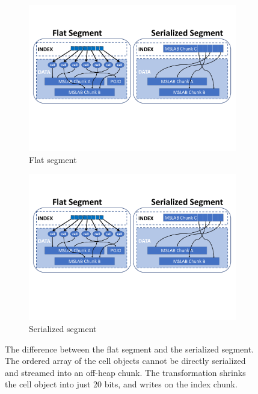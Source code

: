 \begin{figure}[tb]

  \centering
  
  \begin{subfigure}[t]{0.65\columnwidth}
      \includegraphics[width=\figw]{flat-serializing.pdf}
      \caption[]{Flat segment}
    \label{fig:on-heap:flat}  
  \end{subfigure}   
  \begin{subfigure}[t]{0.65\columnwidth}
      \includegraphics[width=\figw]{serialized-serializing.pdf}
      \caption[]{Serialized segment}
    \label{fig:on-heap:ser}
  \end{subfigure}

\caption{The difference between the flat segment and the serialized segment. The ordered array of the cell objects cannot be directly serialized and streamed into an off-heap chunk. The transformation shrinks the cell object into just 20 bits, and writes on the index chunk.} 
\label{fig:on-heap}
\end{figure}


